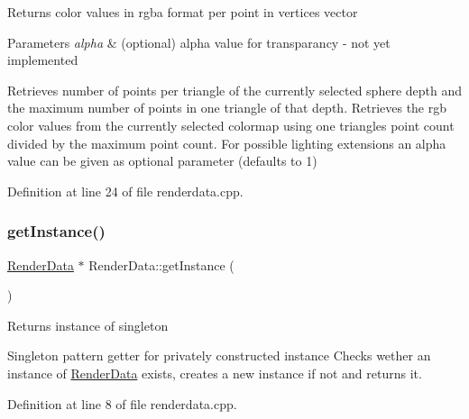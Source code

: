 \begin{DoxyReturn}{Returns}
color values in rgba format per point in vertices vector 
\end{DoxyReturn}

\begin{DoxyParams}{Parameters}
{\em alpha} & (optional) alpha value for transparancy -\/ not yet implemented\\
\hline
\end{DoxyParams}
Retrieves number of points per triangle of the currently selected sphere depth and the maximum number of points in one triangle of that depth. Retrieves the rgb color values from the currently selected colormap using one triangle\textquotesingle{}s point count divided by the maximum point count. For possible lighting extensions an alpha value can be given as optional parameter (defaults to 1) 

Definition at line 24 of file renderdata.\+cpp.

\mbox{\label{class_render_data_a1fffc72f3dd17ab052d4fb2f025ef5a0}} 
\subsubsection{\texorpdfstring{get\+Instance()}{getInstance()}}
{\footnotesize\ttfamily \hyperlink{class_render_data}{Render\+Data} $\ast$ Render\+Data\+::get\+Instance (\begin{DoxyParamCaption}{ }\end{DoxyParamCaption})\hspace{0.3cm}{\ttfamily [static]}}

\begin{DoxyReturn}{Returns}
instance of singleton
\end{DoxyReturn}
Singleton pattern getter for privately constructed instance Checks wether an instance of \hyperlink{class_render_data}{Render\+Data} exists, creates a new instance if not and returns it. 

Definition at line 8 of file renderdata.\+cpp.

\mbox{\label{class_render_data_a24e60dcccd94c47c02e0e47f2ca7b5c2}} 
